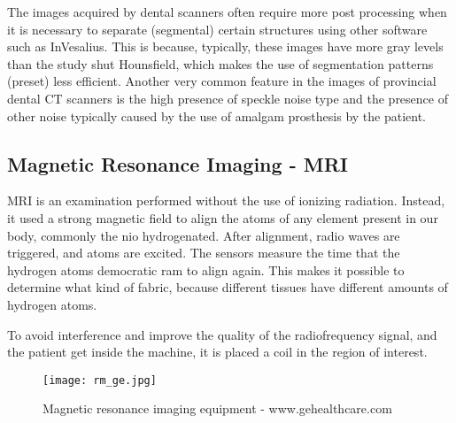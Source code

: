 The images acquired by dental scanners often require more post processing when it is necessary to separate (segmental) certain structures using other software such as InVesalius. This is because, typically, these images have more gray levels than the study shut Hounsfield, which makes the use of segmentation patterns (preset) less efficient. Another very common feature in the images of provincial dental CT scanners is the high presence of speckle noise type and the presence of other noise typically caused by the use of amalgam prosthesis by the patient.

\subsection{Magnetic Resonance Imaging - MRI}


MRI is an examination performed without the use of ionizing radiation. Instead, it used a strong magnetic field to align the atoms of any element present in our body, commonly the nio hydrogenated. After alignment, radio waves are triggered, and atoms are excited. The sensors measure the time that the hydrogen atoms democratic ram to align again. This makes it possible to determine what kind of fabric, because different tissues have different amounts of hydrogen atoms.


To avoid interference and improve the quality of the radiofrequency signal, and the patient get inside the machine, it is placed a coil in the region of interest.

\begin{figure}[!htb]
\centering
\texttt{[image: rm\_ge.jpg]}
\caption{Magnetic resonance imaging equipment - www.gehealthcare.com}
\end{figure}

